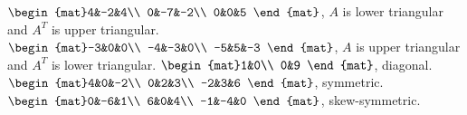 \begin{Answer}
\Question $\begin{mat}4&-2&4\\  0&-7&-2\\  0&0&5 \end{mat}$, $A$ is lower triangular and $A^T$ is upper triangular.
\Question $\begin{mat}-3&0&0\\  -4&-3&0\\  -5&5&-3 \end{mat}$, $A$ is upper triangular and $A^T$ is lower triangular.
\Question $\begin{mat}1&0\\  0&9 \end{mat}$, diagonal.
\Question $\begin{mat}4&0&-2\\  0&2&3\\  -2&3&6 \end{mat}$, symmetric.
\Question $\begin{mat}0&-6&1\\  6&0&4\\  -1&-4&0 \end{mat}$, skew-symmetric.



\end{Answer}
